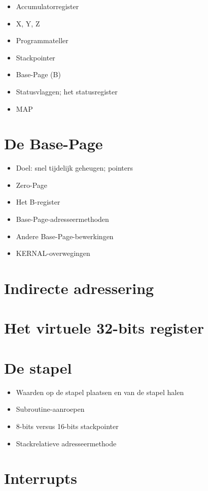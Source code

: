 \begin{itemize}
    \item Accumulatorregister\item X, Y, Z\item Programmateller\item Stackpointer\item Base-Page (B)\item Statusvlaggen; het statusregister\item MAP
\end{itemize}

\section{De Base-Page}

\begin{itemize}
    \item Doel: snel tijdelijk geheugen; pointers\item Zero-Page\item Het B-register\item Base-Page-adresseermethoden\item Andere Base-Page-bewerkingen\item KERNAL-overwegingen
\end{itemize}

\section{Indirecte adressering}


\section{Het virtuele 32-bits register}


\section{De stapel}

\begin{itemize}
    \item Waarden op de stapel plaatsen en van de stapel halen\item Subroutine-aanroepen\item 8-bits versus 16-bits stackpointer\item Stackrelatieve adresseermethode
\end{itemize}

\section{Interrupts}

